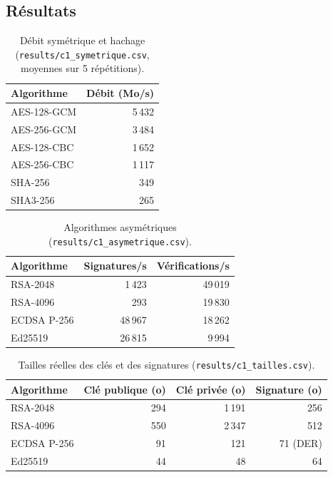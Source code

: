 \documentclass[11pt,a4paper]{article}
\newcommand{\fic}[1]{\texttt{#1}}
\begin{document}
\subsection{Résultats}

\begin{table}[H]
\centering
\begin{tabular}{l r}
\toprule
\textbf{Algorithme} & \textbf{Débit (Mo/s)} \\
\midrule
AES-128-GCM & 5\,432 \\
AES-256-GCM & 3\,484 \\
AES-128-CBC & 1\,652 \\
AES-256-CBC & 1\,117 \\
SHA-256 & 349 \\
SHA3-256 & 265 \\
\bottomrule
\end{tabular}
\caption{Débit symétrique et hachage (\fic{results/c1\_symetrique.csv}, moyennes sur 5 répétitions).}
\end{table}

\begin{table}[H]
\centering
\begin{tabular}{l r r}
\toprule
\textbf{Algorithme} & \textbf{Signatures/s} & \textbf{Vérifications/s} \\
\midrule
RSA-2048 & 1\,423 & 49\,019 \\
RSA-4096 & 293 & 19\,830 \\
ECDSA P-256 & 48\,967 & 18\,262 \\
Ed25519 & 26\,815 & 9\,994 \\
\bottomrule
\end{tabular}
\caption{Algorithmes asymétriques (\fic{results/c1\_asymetrique.csv}).}
\end{table}

\begin{table}[H]
\centering
\begin{tabular}{l r r r}
\toprule
\textbf{Algorithme} & \textbf{Clé publique (o)} & \textbf{Clé privée (o)} & \textbf{Signature (o)} \\
\midrule
RSA-2048 & 294 & 1\,191 & 256 \\
RSA-4096 & 550 & 2\,347 & 512 \\
ECDSA P-256 & 91 & 121 & 71 (DER) \\
Ed25519 & 44 & 48 & 64 \\
\bottomrule
\end{tabular}
\caption{Tailles réelles des clés et des signatures (\fic{results/c1\_tailles.csv}).}
\end{table}
\end{document}

